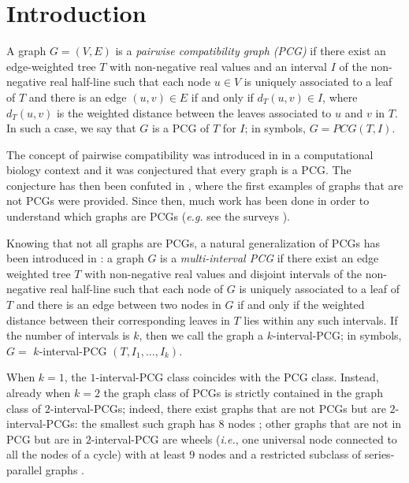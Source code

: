 \documentclass{fundam}
\newcommand{\Int}[1]{$#1$\textnormal{-interval-PCG}}
\begin{document}
\section{Introduction}
\label{sec:intro}

A graph $G = (V , E)$ is a {\em pairwise compatibility graph (PCG)} if there exist an edge-weighted tree $T$ with non-negative real values and an interval $I$ of the non-negative real half-line %
such that each node $u \in V$ is uniquely associated to a leaf of $T$ and there is an edge $(u,v) \in E$ if and only if
$d_{T}(u,v) \in I$,
where $d_{T}(u,v)$ is the weighted distance between the leaves associated to $u$ and $v$ in $T$.
In such a case, we say that $G$ is a PCG of $T$ for $I$;
in symbols, $G = PCG(T , I)$.

\eject
The concept of pairwise compatibility was introduced in \cite{Kearney2003} in a computational biology context and it was conjectured that every graph is a PCG.
The conjecture has then been confuted in \cite{Yanhaona2010}, where the first examples of graphs that are not PCGs were provided.
Since then, much work has been done in order to understand which graphs are PCGs ({\em e.g.} see the surveys \cite{Calamoneri2016,Rahman2020}).

Knowing that not all graphs are PCGs, a natural generalization of PCGs has been introduced in \cite{Ahmed2017}:
a graph $G$ is a {\em multi-interval PCG} if there exist an edge weighted tree $T$ with non-negative real values and disjoint intervals of the non-negative real half-line
such that each node of $G$ is uniquely associated to a leaf of $T$
and there is an edge between two nodes in $G$ if and only if the weighted distance between their corresponding leaves in $T$ lies within any such intervals.
If the number of intervals is $k$, then we call the graph a \Int{k}; in symbols, $G=$ \Int{k} $(T, I_1, \ldots , I_k)$.

When $k= 1$, the \Int{1} class coincides with the PCG class.
Instead, already when $k= 2$ the graph class of PCGs is strictly contained in the graph class of \Int{2}s; indeed, there exist graphs that are not PCGs but are \Int{2}s: the smallest such graph has 8 nodes \cite{Durocher2015}; other graphs that are not in PCG but are in \Int{2} are
wheels ({\em i.e.}, one universal node connected to all the nodes of a cycle) with at least 9 nodes and a restricted subclass of series-parallel graphs \cite{Ahmed2017}.
\end{document}
